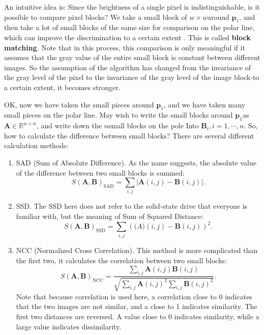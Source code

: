 An intuitive idea is: Since the brightness of a single pixel is indistinguishable, is it possible to compare pixel blocks? We take a small block of $w \times w $around $\bm{p}_1 $, and then take a lot of small blocks of the same size for comparison on the polar line, which can improve the discrimination to a certain extent . This is called \textbf{block matching}. Note that in this process, this comparison is only meaningful if it assumes that the gray value of the entire small block is constant between different images. So the assumption of the algorithm has changed from the invariance of the gray level of the pixel to the invariance of the gray level of the image block-to a certain extent, it becomes stronger.

OK, now we have taken the small pieces around $\bm{p}_1 $, and we have taken many small pieces on the polar line. May wish to write the small blocks around $\bm{p}_1 $as $\bm{A} \in \mathbb{R} ^{w \times w} $, and write down the $n $small blocks on the pole Into $\bm{B}_i, i=1, \cdots, n $. So, how to calculate the difference between small blocks? There are several different calculation methods:

\begin{enumerate}
\item SAD (Sum of Absolute Difference). As the name suggests, the absolute value of the difference between two small blocks is summed:
\begin{equation}
S (\bm{A}, \bm{B})_{\mathrm{SAD}}=\sum_{i, j} | \bm{A} (i, j)-\bm{B} (i, j) |.
\end{equation}
\item SSD. The SSD here does not refer to the solid-state drive that everyone is familiar with, but the meaning of Sum of Squared Distance:
\begin{equation}
S (\bm{A}, \bm{B})_{\mathrm{SSD}}=\sum_{i, j} \left (\bm (A) (i, j)-\bm{B} ( i, j) \right) ^ 2.
\end{equation}
\item NCC (Normalized Cross Correlation). This method is more complicated than the first two, it calculates the correlation between two small blocks:
\begin{equation}
S (\bm{A}, \bm{B})_{\mathrm{NCC}}=\frac{{\sum \limits_{i, j}{\bm{A} (i, j) \bm{ B} (i, j)}}}{{\sqrt{\sum \limits_{i, j}{\bm{A}{{(i, j)} ^ 2} \sum \limits_{i, j}{\bm{B}{{(i, j)} ^ 2}}}}}}.
\end{equation}
Note that because correlation is used here, a correlation close to 0 indicates that the two images are not similar, and a close to 1 indicates similarity. The first two distances are reversed. A value close to 0 indicates similarity, while a large value indicates dissimilarity.
\end{enumerate}

